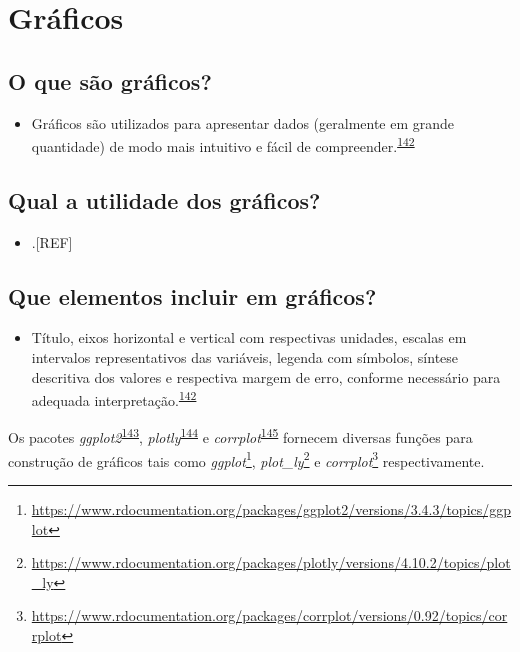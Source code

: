 \documentclass[
  a4paper,
]{book}
\providecommand{\tightlist}{%
  \setlength{\itemsep}{0pt}\setlength{\parskip}{0pt}}
\renewcommand{\href}[2]{#2\footnote{\url{#1}}}
\newenvironment{infobox}[1]
  {
  \begin{itemize}
  \renewcommand{\labelitemi}{
    \raisebox{-.7\height}[0pt][0pt]{
      {\setkeys{Gin}{width=3em,keepaspectratio}
        \texttt{[image: \#1]}}
    }
  }
  \setlength{\fboxsep}{1em}
  \begin{blackbox}
  \item
  }
  {
  \end{blackbox}
  \end{itemize}
  }
\begin{document}
\hypertarget{graficos}{%
\section{Gráficos}\label{graficos}}

\hypertarget{o-que-suxe3o-gruxe1ficos}{%
\subsection{O que são gráficos?}\label{o-que-suxe3o-gruxe1ficos}}

\begin{itemize}
\tightlist
\item
  Gráficos são utilizados para apresentar dados (geralmente em grande quantidade) de modo mais intuitivo e fácil de compreender.\textsuperscript{\protect\hyperlink{ref-Park2022}{142}}
\end{itemize}

\hypertarget{qual-a-utilidade-dos-gruxe1ficos}{%
\subsection{Qual a utilidade dos gráficos?}\label{qual-a-utilidade-dos-gruxe1ficos}}

\begin{itemize}
\tightlist
\item
  .{[}REF{]}
\end{itemize}

\hypertarget{que-elementos-incluir-em-gruxe1ficos}{%
\subsection{Que elementos incluir em gráficos?}\label{que-elementos-incluir-em-gruxe1ficos}}

\begin{itemize}
\tightlist
\item
  Título, eixos horizontal e vertical com respectivas unidades, escalas em intervalos representativos das variáveis, legenda com símbolos, síntese descritiva dos valores e respectiva margem de erro, conforme necessário para adequada interpretação.\textsuperscript{\protect\hyperlink{ref-Park2022}{142}}
\end{itemize}

\begin{infobox}{images/Rlogo}
Os pacotes \emph{ggplot2}\textsuperscript{\protect\hyperlink{ref-ggplot2}{143}}, \emph{plotly}\textsuperscript{\protect\hyperlink{ref-plotly}{144}} e \emph{corrplot}\textsuperscript{\protect\hyperlink{ref-corrplot}{145}} fornecem diversas funções para construção de gráficos tais como \href{https://www.rdocumentation.org/packages/ggplot2/versions/3.4.3/topics/ggplot}{\emph{ggplot}}, \href{https://www.rdocumentation.org/packages/plotly/versions/4.10.2/topics/plot_ly}{\emph{plot\_ly}} e \href{https://www.rdocumentation.org/packages/corrplot/versions/0.92/topics/corrplot}{\emph{corrplot}} respectivamente.

\end{infobox}
\end{document}
